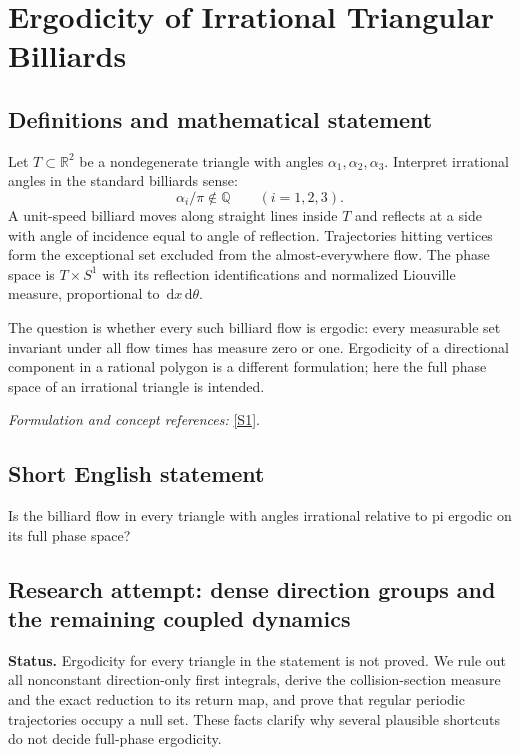 \documentclass[11pt]{article}
\begin{document}
\section*{\texorpdfstring{Ergodicity of Irrational Triangular Billiards}{Ergodicity of Irrational Triangular Billiards}}\label{454}
\subsection{Definitions and mathematical statement}
Let $T\subset{\mathbb{R}}^2$ be a nondegenerate triangle with angles $\alpha_1,\alpha_2,\alpha_3$. Interpret irrational angles in the standard billiards sense:
\[
 \alpha_i/\pi\notin{\mathbb{Q}}\qquad(i=1,2,3).
\]
A unit-speed billiard moves along straight lines inside $T$ and reflects at a side with angle of incidence equal to angle of reflection. Trajectories hitting vertices form the exceptional set excluded from the almost-everywhere flow. The phase space is $T\times S^1$ with its reflection identifications and normalized Liouville measure, proportional to ${\,\mathrm{d}} x{\,\mathrm{d}}\theta$.

The question is whether every such billiard flow is ergodic: every measurable set invariant under all flow times has measure zero or one. Ergodicity of a directional component in a rational polygon is a different formulation; here the full phase space of an irrational triangle is intended.
\par\smallskip\textit{Formulation and concept references:} \href{https://aimath.org/WWN/measrigid/measrigid.pdf}{[S1]}.

\subsection{Short English statement}
Is the billiard flow in every triangle with angles irrational relative to pi ergodic on its full phase space?
\subsection{Research attempt: dense direction groups and the remaining coupled dynamics}
\textbf{Status.} Ergodicity for every triangle in the statement is not proved. We rule out all nonconstant direction-only first integrals, derive the collision-section measure and the exact reduction to its return map, and prove that regular periodic trajectories occupy a null set. These facts clarify why several plausible shortcuts do not decide full-phase ergodicity.
\end{document}
